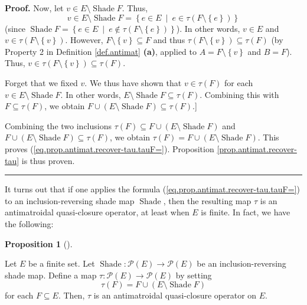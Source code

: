 \documentclass[numbers=enddot,12pt,final,onecolumn]{scrartcl}%
\theoremstyle{definition}
\newtheorem{prop}[theo]{Proposition}
\newenvironment{proposition}[1][]
{\begin{prop}[#1]\begin{leftbar}}
{\end{leftbar}\end{prop}}
\newenvironment{proof}[1][Proof]{\noindent\textbf{#1.} }{\ \rule{0.5em}{0.5em}}
\newenvironment{verlong}{}{}
\begin{document}
\begin{verlong}
\begin{proof}
Now, let $v\in E\setminus\operatorname*{Shade}F$. Thus,
\[
v\in E\setminus\operatorname*{Shade}F=\left\{  e\in E\ \mid\ e\in\tau\left(
F\setminus\left\{  e\right\}  \right)  \right\}
\]
(since $\operatorname*{Shade}F=\left\{  e\in E\ \mid\ e\notin\tau\left(
F\setminus\left\{  e\right\}  \right)  \right\}  $). In other words, $v\in E$
and $v\in\tau\left(  F\setminus\left\{  v\right\}  \right)  $. However,
$F\setminus\left\{  v\right\}  \subseteq F$ and thus $\tau\left(
F\setminus\left\{  v\right\}  \right)  \subseteq\tau\left(  F\right)  $ (by
Property 2 in Definition \ref{def.antimat} \textbf{(a)}, applied to
$A=F\setminus\left\{  v\right\}  $ and $B=F$). Thus, $v\in\tau\left(
F\setminus\left\{  v\right\}  \right)  \subseteq\tau\left(  F\right)  $.

Forget that we fixed $v$. We thus have shown that $v\in\tau\left(  F\right)  $
for each $v\in E\setminus\operatorname*{Shade}F$. In other words,
$E\setminus\operatorname*{Shade}F\subseteq\tau\left(  F\right)  $. Combining
this with $F\subseteq\tau\left(  F\right)  $, we obtain $F\cup\left(
E\setminus\operatorname*{Shade}F\right)  \subseteq\tau\left(  F\right)  $.]

Combining the two inclusions $\tau\left(  F\right)  \subseteq F\cup\left(
E\setminus\operatorname*{Shade}F\right)  $ and $F\cup\left(  E\setminus
\operatorname*{Shade}F\right)  \subseteq\tau\left(  F\right)  $, we obtain
$\tau\left(  F\right)  =F\cup\left(  E\setminus\operatorname*{Shade}F\right)
$. This proves (\ref{eq.prop.antimat.recover-tau.tauF=}). Proposition
\ref{prop.antimat.recover-tau} is thus proven.
\end{proof}
\end{verlong}

It turns out that if one applies the formula
(\ref{eq.prop.antimat.recover-tau.tauF=}) to an inclusion-reversing shade map
$\operatorname*{Shade}$, then the resulting map $\tau$ is an antimatroidal
quasi-closure operator, at least when $E$ is finite. In fact, we have the following:

\begin{proposition}
\label{prop.antimat.tau-from-Shade}Let $E$ be a finite set. Let
$\operatorname*{Shade}:\mathcal{P}\left(  E\right)  \rightarrow\mathcal{P}%
\left(  E\right)  $ be an inclusion-reversing shade map. Define a map
$\tau:\mathcal{P}\left(  E\right)  \rightarrow\mathcal{P}\left(  E\right)  $
by setting%
\begin{equation}
\tau\left(  F\right)  =F\cup\left(  E\setminus\operatorname*{Shade}F\right)
\label{eq.prop.antimat.tau-from-Shade.tauF=}%
\end{equation}
for each $F\subseteq E$. Then, $\tau$ is an antimatroidal quasi-closure
operator on $E$.
\end{proposition}
\end{document}
